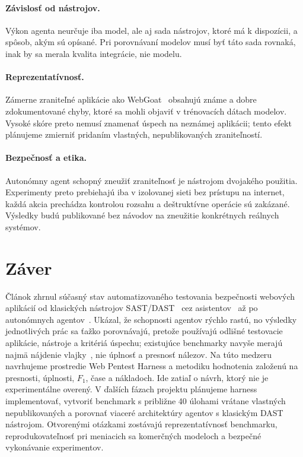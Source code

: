 \documentclass[10pt,twoside,slovak,a4paper]{article}
\begin{document}
\paragraph{Závislosť od nástrojov.} Výkon agenta neurčuje iba model, ale aj sada nástrojov, ktoré má k dispozícii, a spôsob, akým sú opísané. Pri porovnávaní modelov musí byť táto sada rovnaká, inak by sa merala kvalita integrácie, nie modelu.

\paragraph{Reprezentatívnosť.} Zámerne zraniteľné aplikácie ako WebGoat~\cite{OWASP-WebGoat} obsahujú známe a dobre zdokumentované chyby, ktoré sa mohli objaviť v trénovacích dátach modelov. Vysoké skóre preto nemusí znamenať úspech na neznámej aplikácii; tento efekt plánujeme zmierniť pridaním vlastných, nepublikovaných zraniteľností.

\paragraph{Bezpečnosť a etika.} Autonómny agent schopný zneužiť zraniteľnosť je nástrojom dvojakého použitia. Experimenty preto prebiehajú iba v izolovanej sieti bez prístupu na internet, každá akcia prechádza kontrolou rozsahu a deštruktívne operácie sú zakázané. Výsledky budú publikované bez návodov na zneužitie konkrétnych reálnych systémov.

\section{Záver}\label{zaver}
Článok zhrnul súčasný stav automatizovaného testovania bezpečnosti webových aplikácií od klasických nástrojov SAST/DAST~\cite{ZAP,Doupe-Johnny} cez asistentov~\cite{Deng-PentestGPT} až po autonómnych agentov~\cite{Fang-HackWebsites}. Ukázal, že schopnosti agentov rýchlo rastú, no výsledky jednotlivých prác sa ťažko porovnávajú, pretože používajú odlišné testovacie aplikácie, nástroje a kritériá úspechu; existujúce benchmarky navyše merajú najmä nájdenie vlajky~\cite{Zhang-Cybench}, nie úplnosť a presnosť nálezov. Na túto medzeru navrhujeme prostredie Web Pentest Harness a metodiku hodnotenia založenú na presnosti, úplnosti, $F_1$, čase a nákladoch. Ide zatiaľ o návrh, ktorý nie je experimentálne overený. V ďalších fázach projektu plánujeme harness implementovať, vytvoriť benchmark s približne 40 úlohami vrátane vlastných nepublikovaných a porovnať viaceré architektúry agentov s klasickým DAST nástrojom. Otvorenými otázkami zostávajú reprezentatívnosť benchmarku, reprodukovateľnosť pri meniacich sa komerčných modeloch a bezpečné vykonávanie experimentov.



\end{document}
